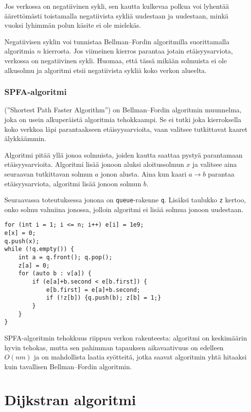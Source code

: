 Jos verkossa on negatiivinen sykli,
sen kautta kulkevaa polkua voi lyhentää äärettömästi
toistamalla negatiivista sykliä uudestaan ja uudestaan,
minkä vuoksi lyhimmän polun käsite ei ole mielekäs.

Negatiivisen syklin voi tunnistaa
Bellman–Fordin algoritmilla
suorittamalla algoritmia $n$ kierrosta.
Jos viimeinen kierros parantaa jotain
etäisyysarviota, verkossa on negatiivinen sykli.
Huomaa, että tässä mikään solmuista ei ole alkusolmu
ja algoritmi etsii negatiivista sykliä koko verkon alueelta.

\subsubsection{SPFA-algoritmi}


 (''Shortest Path Faster Algorithm'')
on Bellman–Fordin algoritmin muunnelma,
joka on usein alkuperäistä algoritmia tehokkaampi.
Se ei tutki joka kierroksella koko verkkoa läpi
parantaakseen etäisyysarvioita, vaan valitsee
tutkittavat kaaret älykkäämmin.

Algoritmi pitää yllä jonoa solmuista,
joiden kautta saattaa pystyä parantamaan etäisyysarvioita.
Algoritmi lisää jonoon aluksi aloitussolmun $x$
ja valitsee aina seuraavan
tutkittavan solmun $a$ jonon alusta.
Aina kun kaari $a \rightarrow b$ parantaa
etäisyysarviota, algoritmi lisää jonoon solmun $b$.

Seuraavassa toteutuksessa jonona on \texttt{queue}-rakenne
\texttt{q}. Lisäksi taulukko \texttt{z} kertoo,
onko solmu valmiina jonossa, jolloin algoritmi ei
lisää solmua jonoon uudestaan.

\begin{lstlisting}
for (int i = 1; i <= n; i++) e[i] = 1e9;
e[x] = 0;
q.push(x);
while (!q.empty()) {
    int a = q.front(); q.pop();
    z[a] = 0;
    for (auto b : v[a]) {
        if (e[a]+b.second < e[b.first]) {
            e[b.first] = e[a]+b.second;
            if (!z[b]) {q.push(b); z[b] = 1;}
        }
    }
}
\end{lstlisting}

SPFA-algoritmin tehokkuus riippuu verkon rakenteesta:
algoritmi on keskimäärin hyvin tehokas, mutta
sen pahimman tapauksen aikavaativuus on edelleen
$O(nm)$ ja on mahdollista
laatia syötteitä, jotka saavat algoritmin yhtä hitaaksi
kuin tavallisen Bellman–Fordin algoritmin.

\section{Dijkstran algoritmi}

